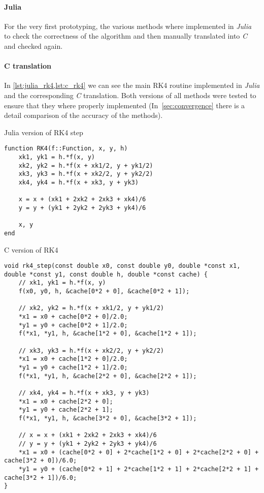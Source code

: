 \paragraph{Julia}
For the very first prototyping, the various methods where implemented in \emph{Julia}
to check the correctness of the algorithm and then manually translated into \emph{C}
and checked again.

\paragraph{C translation}

In \cref{lst:julia_rk4,lst:c_rk4} we can
see the main RK4 routine implemented in \emph{Julia} and the corresponding
\emph{C} translation. Both versions of all methods were tested to ensure that they
where properly implemented (In~\cref{sec:convergence} there is a detail comparison of
the accuracy of the methods).



\begin{listing}[H]
    \caption{Julia version of RK4 step}
    \label{lst:julia_rk4}
\begin{verbatim}
function RK4(f::Function, x, y, h)
    xk1, yk1 = h.*f(x, y)
    xk2, yk2 = h.*f(x + xk1/2, y + yk1/2)
    xk3, yk3 = h.*f(x + xk2/2, y + yk2/2)
    xk4, yk4 = h.*f(x + xk3, y + yk3)

    x = x + (xk1 + 2xk2 + 2xk3 + xk4)/6
    y = y + (yk1 + 2yk2 + 2yk3 + yk4)/6

    x, y
end
\end{verbatim}
\end{listing}

\begin{listing}[H]
    \caption{C version of RK4}
    \label{lst:c_rk4}
\begin{verbatim}
void rk4_step(const double x0, const double y0, double *const x1, double *const y1, const double h, double *const cache) {
    // xk1, yk1 = h.*f(x, y)
    f(x0, y0, h, &cache[0*2 + 0], &cache[0*2 + 1]);

    // xk2, yk2 = h.*f(x + xk1/2, y + yk1/2)
    *x1 = x0 + cache[0*2 + 0]/2.0;
    *y1 = y0 + cache[0*2 + 1]/2.0;
    f(*x1, *y1, h, &cache[1*2 + 0], &cache[1*2 + 1]);

    // xk3, yk3 = h.*f(x + xk2/2, y + yk2/2)
    *x1 = x0 + cache[1*2 + 0]/2.0;
    *y1 = y0 + cache[1*2 + 1]/2.0;
    f(*x1, *y1, h, &cache[2*2 + 0], &cache[2*2 + 1]);

    // xk4, yk4 = h.*f(x + xk3, y + yk3)
    *x1 = x0 + cache[2*2 + 0];
    *y1 = y0 + cache[2*2 + 1];
    f(*x1, *y1, h, &cache[3*2 + 0], &cache[3*2 + 1]);

    // x = x + (xk1 + 2xk2 + 2xk3 + xk4)/6
    // y = y + (yk1 + 2yk2 + 2yk3 + yk4)/6
    *x1 = x0 + (cache[0*2 + 0] + 2*cache[1*2 + 0] + 2*cache[2*2 + 0] + cache[3*2 + 0])/6.0;
    *y1 = y0 + (cache[0*2 + 1] + 2*cache[1*2 + 1] + 2*cache[2*2 + 1] + cache[3*2 + 1])/6.0;
}
\end{verbatim}
\end{listing}

